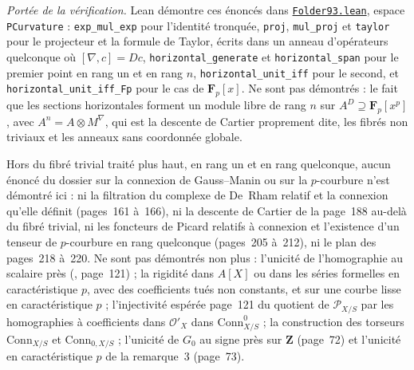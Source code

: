 \begin{sloppypar}
\begingroup\raggedright
\noindent\emph{Portée de la vérification.} Lean démontre ces énoncés dans \href{\leanblob/AlgebraicGeometry/Folder93.lean}{\texttt{Folder93.\allowbreak{}lean}}, espace \texttt{PCurvature} : \texttt{exp\_mul\_exp} pour l'identité tronquée, \texttt{proj}, \texttt{mul\_proj} et \texttt{taylor} pour le projecteur et la formule de Taylor, écrits dans un anneau d'opérateurs quelconque où $[\nabla, c] = Dc$, \texttt{horizontal\_generate} et \texttt{horizontal\_span} pour le premier point en rang un et en rang $n$, \texttt{horizontal\_unit\_iff} pour le second, et \texttt{horizontal\_unit\_iff\_Fp} pour le cas de $\mathbf F_p[x]$. Ne sont pas démontrés : le fait que les sections horizontales forment un module libre de rang $n$ sur $A^{D} \supseteq \mathbf F_p[x^p]$, avec $A^n = A \otimes M^\nabla$, qui est la descente de Cartier proprement dite, les fibrés non triviaux et les anneaux sans coordonnée globale.
\end{sloppypar}\par\endgroup

Hors du fibré trivial traité plus haut, en rang un et en rang quelconque, aucun énoncé du dossier sur la connexion de Gauss--Manin ou sur la $p$-courbure n'est démontré ici : ni la filtration du complexe de De~Rham relatif et la connexion qu'elle définit (pages~161 à~166), ni la descente de Cartier de la page~188 au-delà du fibré trivial, ni les foncteurs de Picard relatifs à connexion et l'existence d'un tenseur de $p$-courbure en rang quelconque (pages~205 à~212), ni le plan des pages~218 à~220. Ne sont pas démontrés non plus : l'unicité de l'homographie au scalaire près (, page~121) ; la rigidité dans $A[X]$ ou dans les séries formelles en caractéristique $p$, avec des coefficients tués non constants, et sur une courbe lisse en caractéristique $p$ ; l'injectivité espérée page~121 du quotient de $\mathcal P_{X/S}$ par les homographies à coefficients dans $\mathcal O'_X$ dans $\mathrm{Conn}^0_{X/S}$ ; la construction des torseurs $\mathrm{Conn}_{X/S}$ et $\mathrm{Conn}_{0,X/S}$ ; l'unicité de $G_0$ au signe près sur $\mathbf Z$ (page~72) et l'unicité en caractéristique $p$ de la remarque~3 (page~73).


